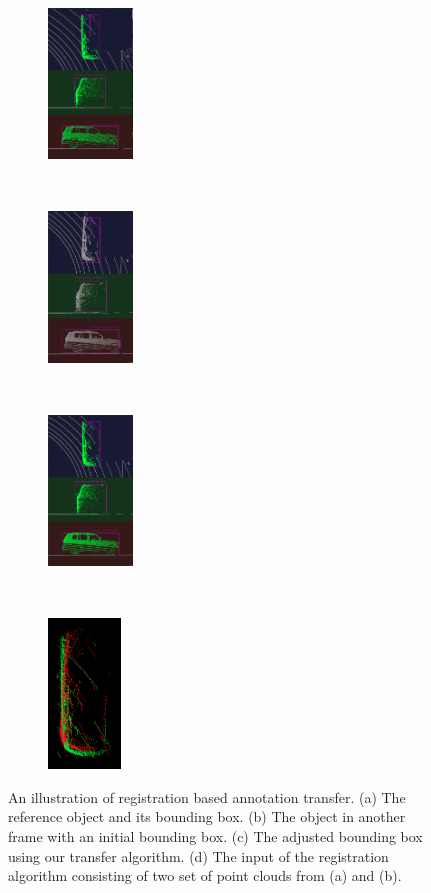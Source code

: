 \documentclass[letterpaper, 10 pt, conference]{ieeeconf}  %
\begin{document}
\begin{figure}[t]
	\centering
	\begin{subfigure}[t]{0.18\linewidth}
		\includegraphics[height=4cm]{./figures/reg-ref-3d}
		\caption{}\label{fig:box-ref}
	\end{subfigure}\hfill
	~
	\begin{subfigure}[t]{0.18\linewidth}
		\includegraphics[height=4cm]{./figures/reg-input-3d}
		\caption{}\label{fig:box-source}
	\end{subfigure}\hfill
	~
	\begin{subfigure}[t]{0.18\linewidth}
		\includegraphics[height=4cm]{./figures/reg-result-3d}
		\caption{}\label{fig:box-output}
	\end{subfigure}\hfill
	~
	\begin{subfigure}[t]{0.18\linewidth}
		\includegraphics[height=4cm]{./figures/reg-input}
		\caption{}\label{fig:reg-input}
	\end{subfigure}\hfill
	\caption{
		An illustration of registration based annotation transfer. (a) The reference object and its bounding box. (b) The object in another frame with an initial bounding box. (c) The adjusted bounding box using our transfer algorithm. (d) The input of the registration algorithm consisting of two set of point clouds from (a) and (b).}		
	\label {fig:annotation-transfer}
\end{figure}
\end{document}
